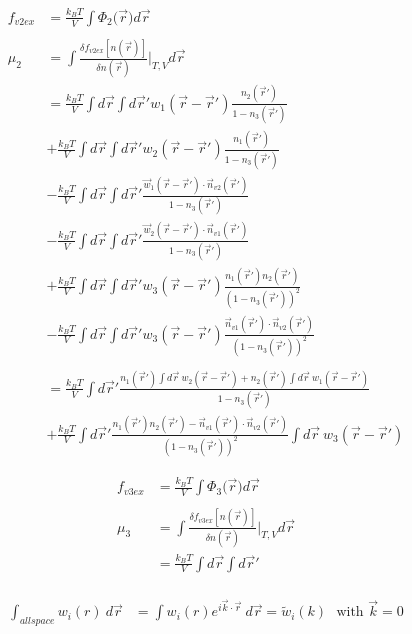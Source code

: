 \documentclass[double,12pt]{beavtex}
\begin{document}
\begin{align}
    f_{v2ex} &= \frac{k_BT}{V}\int \Phi_2(\vec{r}{) d}\vec{r}  \\ \nonumber\\
    \mu_2 &= \int \frac{\delta f_{v2ex}[n(\vec r)]}{\delta n(\vec r)}\bigg|_{T,V} d\vec{r} \\
          &= \frac{k_BT}{V} \int d\vec r \int d \vec r' w_1(\vec r - \vec r')\frac{n_2(\vec r')}{1-n_3(\vec r')}   \nonumber\\
          &+\frac{k_BT}{V} \int d\vec r \int d \vec r' w_2(\vec r - \vec r')\frac{n_1(\vec r')}{1-n_3(\vec r')}   \nonumber\\
          &-\frac{k_BT}{V} \int d\vec r \int d \vec r'\frac{\vec w_1(\vec r - \vec r')\cdot \vec n_{v2}(\vec r')}{1-n_3(\vec r')}  \nonumber\\
          &-\frac{k_BT}{V} \int d\vec r \int d \vec r'\frac{\vec w_2(\vec r - \vec r')\cdot \vec n_{v1}(\vec r')}{1-n_3(\vec r')}  \nonumber\\
          &+\frac{k_BT}{V} \int d\vec r \int d \vec r' w_3(\vec r - \vec r') \frac{n_1(\vec r')n_2(\vec r')}{(1-n_3(\vec r'))^2}  \nonumber\\
          &-\frac{k_BT}{V} \int d\vec r \int d \vec r' w_3(\vec r - \vec r') \frac{\vec n_{v1}(\vec r')\cdot \vec n_{v2}(\vec r')}{(1-n_3(\vec r'))^2}  \\  \nonumber\\
%          
          &= \frac{k_BT}{V} \int d\vec r' \frac{n_1(\vec r')\int d \vec r ~w_2(\vec r - \vec r')+n_2(\vec r')\int d \vec r ~w_1(\vec r - \vec r')}{1-n_3(\vec r')} \nonumber\\
          &+\frac{k_BT}{V} \int d\vec r' \frac{n_1(\vec r')n_2(\vec r')-\vec n_{v1}(\vec r')\cdot \vec n_{v2}(\vec r')}{(1-n_3(\vec r'))^2} \int d \vec r ~w_3(\vec r - \vec r')
\end{align}

\begin{align}
    f_{v3ex} &= \frac{k_BT}{V}\int \Phi_3(\vec{r}{) d}\vec{r}  \\ \nonumber\\
    \mu_3 &= \int \frac{\delta f_{v3ex}[n(\vec r)]}{\delta n(\vec r)}\bigg|_{T,V} d\vec{r} \\
          &= \frac{k_BT}{V} \int d\vec r \int d \vec r'   \nonumber\\
\end{align}          

\begin{align}
   \int_{all space} w_i(r) ~d\vec r &= \int w_i(r)e^{i\vec k \cdot \vec r}~d\vec r  = \widetilde{w}_i(k) \mbox{~~with $\vec k = 0$}
\end{align}
\end{document}
